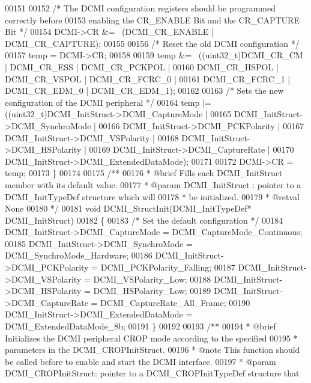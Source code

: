 \begin{DoxyCode}
00151 
00152   \textcolor{comment}{/* The DCMI configuration registers should be programmed correctly before }
00153 \textcolor{comment}{  enabling the CR\_ENABLE Bit and the CR\_CAPTURE Bit */}
00154   DCMI->CR &= ~(DCMI_CR_ENABLE | DCMI_CR_CAPTURE);
00155 
00156   \textcolor{comment}{/* Reset the old DCMI configuration */}
00157   temp = DCMI->CR;
00158 
00159   temp &= ~((uint32\_t)DCMI_CR_CM     | DCMI_CR_ESS   | DCMI_CR_PCKPOL |
00160                       DCMI_CR_HSPOL  | DCMI_CR_VSPOL | DCMI_CR_FCRC_0 |
00161                       DCMI_CR_FCRC_1 | DCMI_CR_EDM_0 | DCMI_CR_EDM_1);
00162 
00163   \textcolor{comment}{/* Sets the new configuration of the DCMI peripheral */}
00164   temp |= ((uint32\_t)DCMI\_InitStruct->DCMI_CaptureMode |
00165                      DCMI\_InitStruct->DCMI_SynchroMode |
00166                      DCMI\_InitStruct->DCMI_PCKPolarity |
00167                      DCMI\_InitStruct->DCMI_VSPolarity |
00168                      DCMI\_InitStruct->DCMI_HSPolarity |
00169                      DCMI\_InitStruct->DCMI_CaptureRate |
00170                      DCMI\_InitStruct->DCMI_ExtendedDataMode);
00171 
00172   DCMI->CR = temp;
00173 \}
00174 
00175 \textcolor{comment}{/**}
00176 \textcolor{comment}{  * @brief  Fills each DCMI\_InitStruct member with its default value.}
00177 \textcolor{comment}{  * @param  DCMI\_InitStruct : pointer to a DCMI\_InitTypeDef structure which will}
00178 \textcolor{comment}{  *         be initialized.}
00179 \textcolor{comment}{  * @retval None}
00180 \textcolor{comment}{  */}
00181 \textcolor{keywordtype}{void} DCMI_StructInit(DCMI\_InitTypeDef* DCMI\_InitStruct)
00182 \{
00183   \textcolor{comment}{/* Set the default configuration */}
00184   DCMI\_InitStruct->DCMI_CaptureMode = DCMI_CaptureMode_Continuous;
00185   DCMI\_InitStruct->DCMI_SynchroMode = DCMI_SynchroMode_Hardware;
00186   DCMI\_InitStruct->DCMI_PCKPolarity = DCMI_PCKPolarity_Falling;
00187   DCMI\_InitStruct->DCMI_VSPolarity = DCMI_VSPolarity_Low;
00188   DCMI\_InitStruct->DCMI_HSPolarity = DCMI_HSPolarity_Low;
00189   DCMI\_InitStruct->DCMI_CaptureRate = DCMI_CaptureRate_All_Frame;
00190   DCMI\_InitStruct->DCMI_ExtendedDataMode = DCMI_ExtendedDataMode_8b;
00191 \}
00192 
00193 \textcolor{comment}{/**}
00194 \textcolor{comment}{  * @brief  Initializes the DCMI peripheral CROP mode according to the specified}
00195 \textcolor{comment}{  *         parameters in the DCMI\_CROPInitStruct.}
00196 \textcolor{comment}{  * @note   This function should be called before to enable and start the DCMI interface.   }
00197 \textcolor{comment}{  * @param  DCMI\_CROPInitStruct:  pointer to a DCMI\_CROPInitTypeDef structure that }

\end{DoxyCode}
